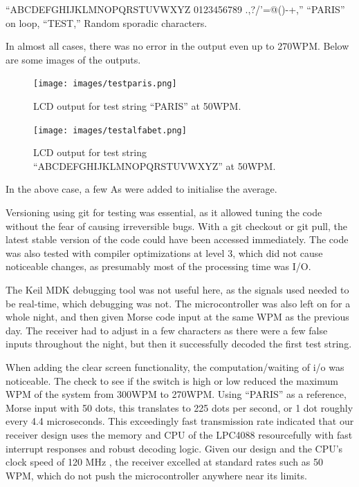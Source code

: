 \documentclass[head=13.6pt]{cce2014-design}
\begin{document}
“ABCDEFGHIJKLMNOPQRSTUVWXYZ 0123456789 .,?/'=@()-+,”
“PARIS” on loop,
“TEST,”
Random sporadic characters.

In almost all cases, there was no error in the output even up to 270WPM. Below are some images of the outputs.

\begin{figure}[tb]
    \centering
    \texttt{[image: images/testparis.png]}
    \caption{LCD output for test string ``PARIS'' at 50WPM.}
    \label{testparis}
\end{figure}

\begin{figure}[tb]
    \centering
    \texttt{[image: images/testalfabet.png]}
    \caption{LCD output for test string ``ABCDEFGHIJKLMNOPQRSTUVWXYZ'' at 50WPM.}
    \label{testalfabet}
\end{figure}

In the above case, a few As were added to initialise the average.



Versioning using git for testing was essential, as it allowed tuning the code without the fear of causing irreversible bugs. With a git checkout or git pull, the latest stable version of the code could have been accessed immediately. The code was also tested with compiler optimizations at level 3, which did not cause noticeable changes, as presumably most of the processing time was I/O.

The Keil MDK debugging tool was not useful here, as the signals used needed to be real-time, which debugging was not. The microcontroller was also left on for a whole night, and then given Morse code input at the same WPM as the previous day. The receiver had to adjust in a few characters as there were a few false inputs throughout the night, but then it successfully decoded the first test string.

When adding the clear screen functionality, the computation/waiting of i/o was noticeable. The check to see if the switch is high or low reduced the maximum WPM of the system from 300WPM to 270WPM. Using “PARIS” as a reference, Morse input with 50 dots, this translates to 225 dots per second, or 1 dot roughly every 4.4 microseconds. This exceedingly fast transmission rate indicated that our receiver design uses the memory and CPU of the LPC4088 resourcefully with fast interrupt responses and robust decoding logic. Given our design and the CPU’s clock speed of 120 MHz \cite{lpc4088oem}, the receiver excelled at standard rates such as 50 WPM, which do not push the microcontroller anywhere near its limits.
\end{document}
